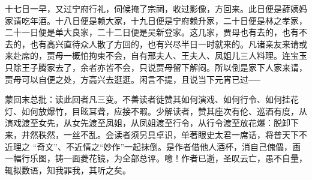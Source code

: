 \begin{parag}


    十七日一早，又过宁府行礼，伺候掩了宗祠，收过影像，方回来。此日便是薛姨妈家请吃年酒。十八日便是赖大家，十九日便是宁府赖升家，二十日便是林之孝家，二十一日便是单大良家，二十二日便是吴新登家。这几家，贾母也有去的，也有不去的，也有高兴直待众人散了方回的，也有兴尽半日一时就来的。凡诸亲友来请或来赴席的，贾母一概怕拘束不会，自有邢夫人、王夫人、凤姐儿三人料理。连宝玉只除王子腾家去了，余者亦皆不会，只说贾母留下解闷。所以倒是家下人家来请，贾母可以自便之处，方高兴去逛逛。闲言不提，且说当下元宵已过──
\end{parag}

\begin{parag}

    \begin{note}蒙回末总批：读此回者凡三变。不善读者徒赞其如何演戏、如何行令、如何挂花灯、如何放爆竹，目眩耳聋，应接不暇。少解读者，赞其座次有伦、巡酒有度，从演戏渡至女先，从女先渡至凤姐，从凤姐渡至行令，从行令渡至放花爆：脱卸下来，井然秩然，一丝不乱。会读者须另具卓识，单著眼史太君一席话，将普天下不近理之 “奇文”、不近情之“妙作”一起抹倒。是作者借他人酒杯，消自己傀儡，画一幅行乐图，铸一面菱花镜，为全部总评。噫！作者已逝，圣叹云亡，愚不自量，辄拟数语，知我罪我，其听之矣。\end{note}
\end{parag}

